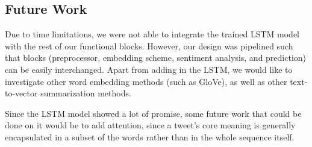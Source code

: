 \documentclass{sig-alternate-05-2015}
\begin{document}
	\subsection{Future Work}
	Due to time limitations, we were not able to integrate the trained LSTM model with the rest of our functional blocks. However, our design was pipelined such that blocks (preprocessor, embedding scheme, sentiment analysis, and prediction) can be easily interchanged. Apart from adding in the LSTM, we would like to investigate other word embedding methods (such as GloVe), as well as other text-to-vector summarization methods. 
	\par
	Since the LSTM model showed a lot of promise, some future work that could be done on it would be to add attention, since a tweet's core meaning is generally encapsulated in a subset of the words rather than in the whole sequence itself. 
	
\end{document}
